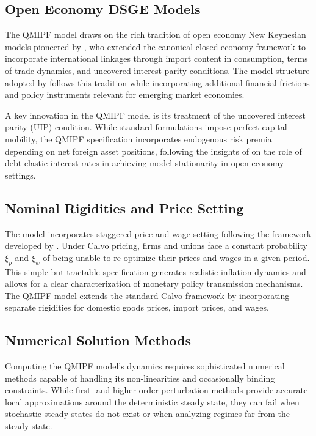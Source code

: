\documentclass[12pt]{article}
\begin{document}
\subsection{Open Economy DSGE Models}

The QMIPF model draws on the rich tradition of open economy New Keynesian models pioneered by \citet{gali2005monetary}, who extended the canonical closed economy framework to incorporate international linkages through import content in consumption, terms of trade dynamics, and uncovered interest parity conditions. The model structure adopted by \citet{adrian2021quantitative} follows this tradition while incorporating additional financial frictions and policy instruments relevant for emerging market economies.

A key innovation in the QMIPF model is its treatment of the uncovered interest parity (UIP) condition. While standard formulations impose perfect capital mobility, the QMIPF specification incorporates endogenous risk premia depending on net foreign asset positions, following the insights of \citet{schmitt2003closing} on the role of debt-elastic interest rates in achieving model stationarity in open economy settings.

\subsection{Nominal Rigidities and Price Setting}

The model incorporates staggered price and wage setting following the framework developed by \citet{calvo1983staggered}. Under Calvo pricing, firms and unions face a constant probability $\xi_p$ and $\xi_w$ of being unable to re-optimize their prices and wages in a given period. This simple but tractable specification generates realistic inflation dynamics and allows for a clear characterization of monetary policy transmission mechanisms. The QMIPF model extends the standard Calvo framework by incorporating separate rigidities for domestic goods prices, import prices, and wages.

\subsection{Numerical Solution Methods}

Computing the QMIPF model's dynamics requires sophisticated numerical methods capable of handling its non-linearities and occasionally binding constraints. While first- and higher-order perturbation methods \citep{schmitt2004solving,andreasen2018pruning} provide accurate local approximations around the deterministic steady state, they can fail when stochastic steady states do not exist or when analyzing regimes far from the steady state.
\end{document}
